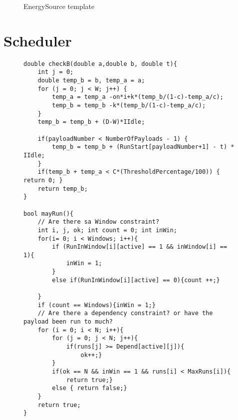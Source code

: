 \begin{figure}[H]
	\centering
	\caption{EnergySource template}
	\label{appendix:smc_ES}
\end{figure}

\section{Scheduler}
\begin{figure}[H]
	\begin{lstlisting}[language=my_c, caption={Declarations for Scheduler template}, label=lst:scheduler_code]
double checkB(double a,double b, double t){
	int j = 0;
	double temp_b = b, temp_a = a;
	for (j = 0; j < W; j++) {
		temp_a = temp_a -on*i+k*(temp_b/(1-c)-temp_a/c);
		temp_b = temp_b -k*(temp_b/(1-c)-temp_a/c);
	}
	temp_b = temp_b + (D-W)*IIdle;
	
	if(payloadNumber < NumberOfPayloads - 1) {
		temp_b = temp_b + (RunStart[payloadNumber+1] - t) * IIdle;
	}
	if(temp_b + temp_a < C*(ThresholdPercentage/100)) { return 0; }
	return temp_b;
}

bool mayRun(){
	// Are there sa Window constraint?
	int i, j, ok; int count = 0; int inWin;
	for(i= 0; i < Windows; i++){
		if (RunInWindow[i][active] == 1 && inWindow[i] == 1){
			inWin = 1;
		}
		else if(RunInWindow[i][active] == 0){count ++;}
		
	}
	if (count == Windows){inWin = 1;}
	// Are there a dependency constraint? or have the payload been run to much?
	for (i = 0; i < N; i++){
		for (j = 0; j < N; j++){
			if(runs[j] >= Depend[active][j]){
				ok++;}
		}
		if(ok == N && inWin == 1 && runs[i] < MaxRuns[i]){
			return true;}
		else { return false;}
	}
	return true;
}
	\end{lstlisting}
\end{figure}

